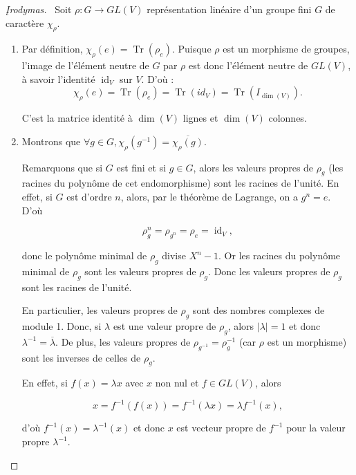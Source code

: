 \documentclass[french]{book}
\theoremstyle{definition}
\begin{document}
\begin{proof}[\k{I}rodymas]

  \
  Soit \(\rho : G \longrightarrow GL(V)\) représentation linéaire d'un groupe fini \(G\) de caractère \(\chi _{\rho}\).
  \begin{enumerate}
    \item Par définition, \(\chi _{\rho}(e) = \operatorname{Tr}(\rho_e) \). Puisque \(\rho\) est un morphisme de groupes, l'image de l'élément neutre de \(G\) par \(\rho\) est donc l'élément neutre de \(GL(V)\), à savoir l'identité \(\operatorname{id}_V\) sur \(V\). D'où : \[\chi _{\rho}(e) = \operatorname{Tr}(\rho_e) = \operatorname{Tr}(id_V) = \operatorname{Tr}(I _{\operatorname{dim}(V)}). \]

    C'est la matrice identité à \(\operatorname{dim}(V)\) lignes et \(\operatorname{dim}(V)\) colonnes.

    \item Montrons que \(\forall g \in G, \chi _{\rho}(g ^{-1} ) = \overline{\chi _{\rho}(g)}\).

    Remarquons que si \(G\) est fini et si \(g \in G\), alors les valeurs propres de \(\rho_g\) (les racines du polynôme de cet endomorphisme) sont les racines de l'unité. En effet, si \(G\) est d'ordre \(n\), alors, par le théorème de Lagrange, on a \(g ^{n} = e\). D'où

    \[\rho_g ^{n} = \rho _{g ^{n}} = \rho_e = \operatorname{id}_V,\]

    donc le polynôme minimal de \(\rho_g\) divise \(X ^{n}-1\). Or les racines du polynôme minimal de \(\rho_g\) sont les valeurs propres de \(\rho_g\). Donc les valeurs propres de \(\rho_g\) sont les racines de l'unité.

    En particulier, les valeurs propres de \(\rho_g\) sont des nombres complexes de module 1. Donc, si \(\lambda \) est une valeur propre de \(\rho_g\), alors \(\lvert \lambda  \rvert = 1\) et donc \(\lambda  ^{-1} = \overline{\lambda }\). De plus, les valeurs propres de \(\rho _{g ^{-1}} = \rho _{g} ^{-1} \) (car \(\rho\) est un morphisme) sont les inverses de celles de \(\rho_g\).

    En effet, si \(f(x) = \lambda x\) avec \(x\) non nul et \(f \in GL(V)\), alors

    \[x =  f ^{-1} (f(x)) = f ^{-1} (\lambda x) = \lambda f ^{-1} (x),\]

    d'où \(f ^{-1} (x) = \lambda ^{-1} (x)\) et donc \(x\) est vecteur propre de \(f ^{-1} \) pour la valeur propre \(\lambda ^{-1} \).


\end{enumerate}
\end{proof}
\end{document}

